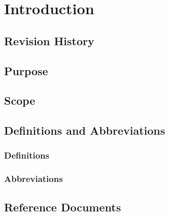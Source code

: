 \newpage
\section{Introduction}
\subsection{Revision History}
\subsection{Purpose}
\subsection{Scope}
\subsection{Definitions and Abbreviations}
\subsubsection{Definitions}
\subsubsection{Abbreviations}
\subsection{Reference Documents}